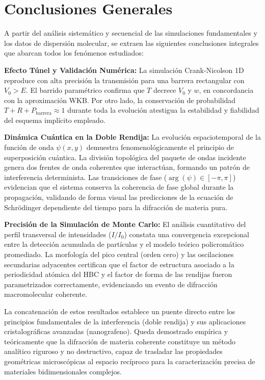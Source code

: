 \section{Conclusiones Generales}

A partir del análisis sistemático y secuencial de las simulaciones fundamentales y los datos de dispersión molecular, se extraen las siguientes conclusiones integrales que abarcan todos los fenómenos estudiados:

\textbf{Efecto Túnel y Validación Numérica:} La simulación Crank-Nicolson 1D reproduce con alta precisión la transmisión para una barrera rectangular con $V_0 > E$. El barrido paramétrico confirma que $T$ decrece $V_0$ y $w$, en concordancia con la  aproximación WKB. Por otro lado, la conservación de probabilidad $T+R+P_\text{barrera}\approx 1$ durante toda la evolución atestigua la estabilidad y fiabilidad del esquema implícito empleado.
 
\textbf{Dinámica Cuántica en la Doble Rendija:} La evolución espaciotemporal de la función de onda $\psi(x,y)$ demuestra fenomenológicamente el principio de superposición cuántica. La división topológica del paquete de ondas incidente genera dos frentes de onda coherentes que interactúan, formando un patrón de interferencia determinista. Las transiciones de fase ($\arg(\psi) \in [-\pi, \pi]$) evidencian que el sistema conserva la coherencia de fase global durante la propagación, validando de forma visual las predicciones de la ecuación de Schrödinger dependiente del tiempo para la difracción de materia pura.


\textbf{Precisión de la Simulación de Monte Carlo:} El análisis cuantitativo del perfil transversal de intensidades ($I/I_0$) constata una convergencia excepcional entre la detección acumulada de partículas y el modelo teórico policromático promediado. La morfología del pico central (orden cero) y las oscilaciones secundarias adyacentes certifican que el factor de estructura asociado a la periodicidad atómica del HBC y el factor de forma de las rendijas fueron parametrizados correctamente, evidenciando un evento de difracción macromolecular coherente.


La concatenación de estos resultados establece un puente directo entre los principios fundamentales de la interferencia (doble rendija) y sus aplicaciones cristalográficas avanzadas (nanografeno). Queda demostrado empírica y teóricamente que la difracción de materia coherente constituye un método analítico riguroso y no destructivo, capaz de trasladar las propiedades geométricas microscópicas al espacio recíproco para la caracterización precisa de materiales bidimensionales complejos.



